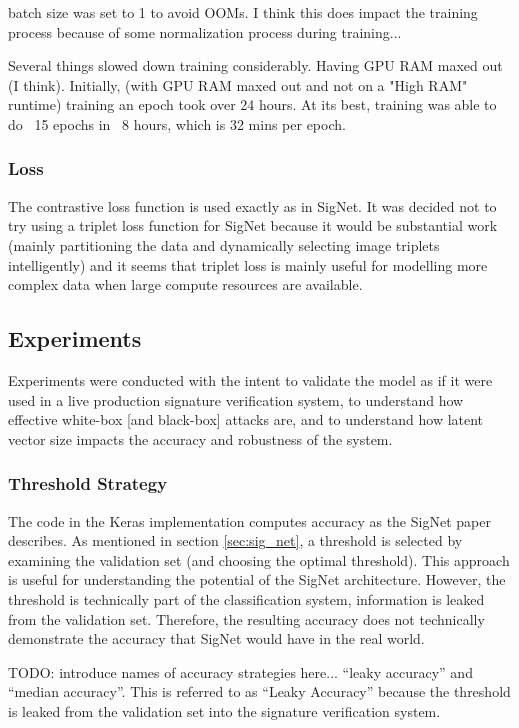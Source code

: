 batch size was set to 1 to avoid OOMs.
I think this does impact the training process because of some normalization process during training...

Several things slowed down training considerably.
Having GPU RAM maxed out (I think).
Initially, (with GPU RAM maxed out and not on a "High RAM" runtime) training an epoch took over 24 hours.
At its best, training was able to do ~15 epochs in ~8 hours, which is 32 mins per epoch.


\subsubsection{Loss}
The contrastive loss function is used exactly as in SigNet\cite{GitHub_sounakdey}.
It was decided not to try using a triplet loss function for SigNet because it would be substantial work (mainly partitioning the data and dynamically selecting image triplets intelligently) and it seems that triplet loss is mainly useful for modelling more complex data when large compute resources are available.


\subsection{Experiments}

Experiments were conducted with the intent to validate the model as if it were used in a live production signature verification system, to understand how effective white-box [and black-box] attacks are, and to understand how latent vector size impacts the accuracy and robustness of the system.

\subsubsection{Threshold Strategy}\label{sec:threshold}

The code in the Keras implementation computes accuracy as the SigNet paper describes.
As mentioned in section \ref{sec:sig_net}, a threshold is selected by examining the validation set (and choosing the optimal threshold).
This approach is useful for understanding the potential of the SigNet architecture.
However, the threshold is technically part of the classification system, information is leaked from the validation set.
Therefore, the resulting accuracy does not technically demonstrate the accuracy that SigNet would have in the real world.


TODO: introduce names of accuracy strategies here... ``leaky accuracy'' and ``median accuracy''.
This is referred to as ``Leaky Accuracy'' because the threshold is leaked from the validation set into the signature verification system.


